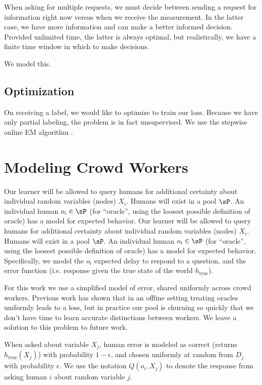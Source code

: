 When asking for multiple requests, we must decide between sending a request for information right now versus when we receive the measurement.
In the latter case, we have more information and can make a better informed decision.
Provided unlimited time, the latter is always optimal, but realistically, we have a finite time window in which to make decisions.

We model this.

\subsection{Optimization}

On receiving a label, we would like to optimize to train our loss.
Because we have only partial labeling, the problem is in fact unsupervised.
We use the stepwise online EM algorithm \cite{liang09online}.

\section{Modeling Crowd Workers}


Our learner will be allowed to query humans for additional certainty about individual random variables (nodes) $X_i$.
 Humans will exist in a pool $\sP$.
 An individual human $o_i \in \sP$ (for ``oracle'', using the loosest possible definition of oracle) has a model for expected behavior.
Our learner will be allowed to query humans for additional certainty about individual random variables (nodes) $X_i$.
 Humans will exist in a pool $\sP$.
 An individual human $o_i \in \sP$ (for ``oracle'', using the loosest possible definition of oracle) has a model for expected behavior. Specifically, we model the $o_i$ expected delay to respond to a question, and the error function (i.e. response given the true state of the world $h_{\text{true}}$).

For this work we use a simplified model of error, shared uniformly across crowd workers.
 Previous work \cite{yan2011active} \cite{donmez2008proactive} \cite{golovin2010near} has shown that in an offline setting treating oracles uniformly leads to a loss, but in practice our pool is churning so quickly that we don't have time to learn accurate distinctions between workers.
 We leave a solution to this problem to future work.

When asked about variable $X_j$, human error is modeled as correct (returns $h_{\text{true}}(X_j)$) with probability $1-\epsilon$, and chosen uniformly at random from $D_j$ with probability $\epsilon$.
 We use the notation $Q(o_i, X_j)$ to denote the response from asking human $i$ about random variable $j$.

